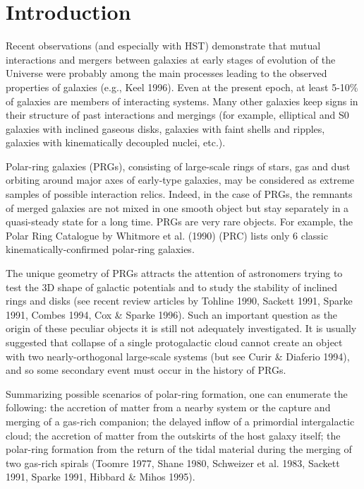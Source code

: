 \section{Introduction}

Recent observations (and especially with HST) demonstrate
that mutual interactions and mergers between galaxies at early
stages of evolution of the Universe were probably among the main
processes leading to the observed properties of galaxies
(e.g., Keel 1996). Even at the present epoch, at least 5-10\% of
galaxies are members of interacting systems. Many other
galaxies keep signs in their structure of past interactions
and mergings (for example, elliptical and S0 galaxies with inclined
gaseous disks, galaxies with faint shells and ripples, galaxies with
kinematically decoupled nuclei, etc.). 

Polar-ring galaxies (PRGs), 
consisting of large-scale rings of stars, gas and dust orbiting around
major axes of early-type galaxies, may be considered as extreme samples
of possible interaction relics. Indeed, in the case of PRGs, 
the remnants of merged galaxies are not mixed in one smooth object 
but stay separately in a quasi-steady state for a long time.
PRGs are very rare objects. For example, the Polar Ring Catalogue by
Whitmore et al. (1990) (PRC) lists only 6 classic kinematically-confirmed
polar-ring galaxies. 

The unique geometry of PRGs attracts the attention of astronomers trying
to test the 3D shape of galactic potentials and to study the stability of 
inclined rings and disks (see recent review articles by Tohline 1990, 
Sackett 1991,
Sparke 1991, Combes 1994, Cox \& Sparke 1996). Such an important 
question
as the origin of these peculiar objects it is still not 
adequately investigated. 
It is usually suggested that collapse of a single protogalactic cloud
cannot create an object with two nearly-orthogonal large-scale systems 
(but see Curir \& Diaferio 1994), 
and so some secondary event must occur in the history of PRGs. 

Summarizing possible scenarios of polar-ring formation, one can 
enumerate the following:
the accretion of matter from a nearby system or 
the capture and merging of a gas-rich companion;
the delayed inflow of a primordial intergalactic cloud;
the accretion of matter from the outskirts of the host galaxy itself; 
the polar-ring formation from the return of the tidal material during 
the merging of two gas-rich spirals 
(Toomre 1977, Shane 1980, Schweizer et al. 1983,
Sackett 1991, Sparke 1991, Hibbard \& Mihos 1995).

